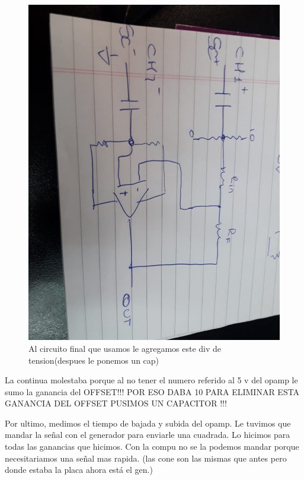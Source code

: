 \documentclass[a4paper,12pt]{article}
\begin{document}
\begin{figure}[H]
\centering
     \includegraphics[scale=0.40]{final.jpeg}
     \caption{Al circuito final que usamos le agregamos este div de tension(despues le ponemos un cap)}
     \label{snr_log_micro}
\end{figure}


La continua molestaba porque al no tener el numero referido al 5 v del opamp le sumo la ganancia del OFFSET!!! POR ESO DABA 10 
PARA ELIMINAR ESTA GANANCIA DEL OFFSET PUSIMOS UN CAPACITOR !!!




Por ultimo, medimos el tiempo de bajada y subida del opamp. Le tuvimos que mandar la señal con el generador para enviarle una cuadrada. Lo hicimos para todas las ganancias que hicimos. Con la compu no se la podemos mandar porque necesitariamos una señal mas rapida. (las cone son las mismas que antes pero donde estaba la placa ahora está el gen.) 
\end{document}
